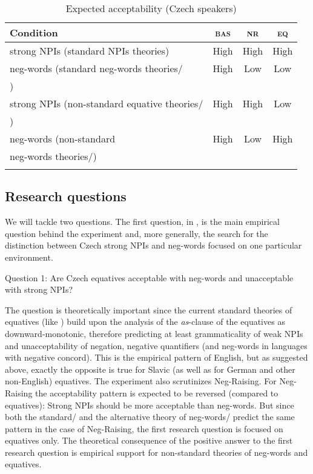 \documentclass[output=paper,colorlinks,citecolor=brown]{langscibook}
\begin{document}
\begin{table}
	\centering
	\caption{Expected acceptability (Czech speakers)}\label{tab:expected_responses}
	\begin{tabular}{lccc}
		\lsptoprule%
		Condition & \textsc{bas} & \textsc{nr} & \textsc{eq} \\ \midrule%
		strong NPIs (standard NPIs theories) & High & High & High \\
		neg-words (standard neg-words theories/ & High & Low & Low \\
    \cite{zeijlstra2004sentential}) & & & \\
		strong NPIs (non-standard equative theories/ & High & High & Low \\
    \cite{penka2016degree}) & & & \\
		neg-words (non-standard  & High & Low & High \\
    neg-words theories/\cite{ovalle2004double}) & & & \\ \lspbottomrule%
	\end{tabular}
\end{table}


\subsection{Research questions}

We will tackle two questions. The first question, in , is the main empirical question behind the experiment and, more generally, the search for the distinction between Czech strong NPIs and neg-words focused on one particular environment. 

\ea\label{ex-6} Question 1: Are Czech equatives acceptable with neg-words and unacceptable with strong NPIs?
\z

\noindent The question is theoretically important since the current standard theories of equatives (like \cite{stechow1984comparing,beck_comparison_nodate}) build upon the analysis of the \textit{as}-clause of the equatives as downward-monotonic, therefore predicting at least grammaticality of weak NPIs and unacceptability of negation, negative quantifiers (and neg-words in languages with negative concord). This is the empirical pattern of English, but as suggested above, exactly the opposite is true for Slavic (as well as for German and other non-English) equatives. The experiment also scrutinizes Neg-Raising. For Neg-Raising the acceptability pattern is expected to be reversed (compared to equatives): Strong NPIs should be more acceptable than neg-words. But since both the standard/\citet{zeijlstra2004sentential} and the alternative theory of neg-words/\citet{ovalle2004double} predict the same pattern in the case of Neg-Raising, the first research question is focused on equatives only. The theoretical consequence of the positive answer to the first research question is empirical support for non-standard theories of neg-words and equatives.
\end{document}
